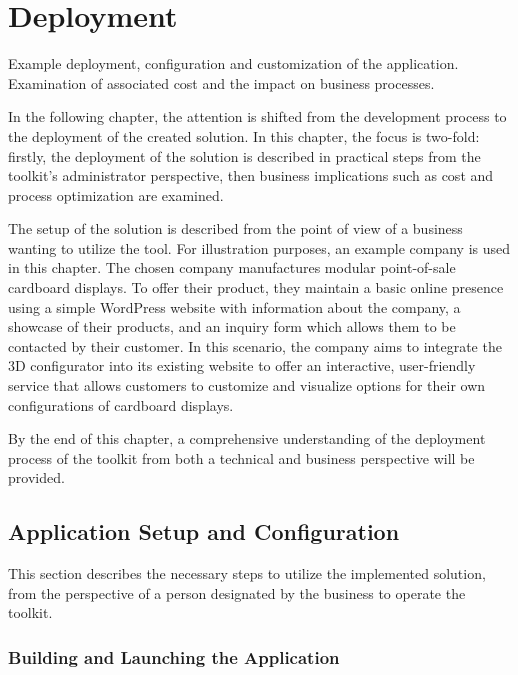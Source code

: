 \chapter{Deployment}

\begin{chapterabstract}
    Example deployment, configuration and customization of the application. Examination of associated cost and the impact on business processes.
\end{chapterabstract}

In the following chapter, the attention is shifted from the development process to the deployment of the created solution. In this chapter, the focus is two-fold: firstly, the deployment of the solution is described in practical steps from the toolkit's administrator perspective, then business implications such as cost and process optimization are examined.

The setup of the solution is described from the point of view of a business wanting to utilize the tool. For illustration purposes, an example company is used in this chapter. The chosen company manufactures modular point-of-sale cardboard displays. To offer their product, they maintain a basic online presence using a simple WordPress website with information about the company, a showcase of their products, and an inquiry form which allows them to be contacted by their customer. In this scenario, the company aims to integrate the 3D configurator into its existing website to offer an interactive, user-friendly service that allows customers to customize and visualize options for their own configurations of cardboard displays.

By the end of this chapter, a comprehensive understanding of the deployment process of the toolkit from both a technical and business perspective will be provided.


\section{Application Setup and Configuration}

This section describes the necessary steps to utilize the implemented solution, from the perspective of a person designated by the business to operate the toolkit.


\subsection{Building and Launching the Application}

